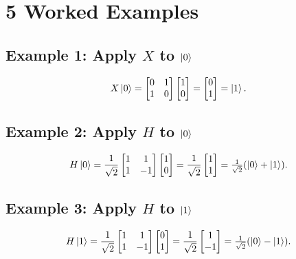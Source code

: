 \documentclass[12pt]{article}
\begin{document}
\section*{5 \quad Worked Examples}

\subsection*{Example 1: Apply \(X\) to \(\ket{0}\)}
\[
   X\ket{0} =
   \begin{bmatrix}0&1\\1&0\end{bmatrix}
   \begin{bmatrix}1\\0\end{bmatrix}
   =
   \begin{bmatrix}0\\1\end{bmatrix}
   =\ket{1}.
\]

\subsection*{Example 2: Apply \(H\) to \(\ket{0}\)}
\[
   H\ket{0}
   =
   \frac1{\sqrt2}
   \begin{bmatrix}1&1\\1&-1\end{bmatrix}
   \begin{bmatrix}1\\0\end{bmatrix}
   =
   \frac1{\sqrt2}
   \begin{bmatrix}1\\1\end{bmatrix}
   =
   \tfrac1{\sqrt2}(\ket{0}+\ket{1}).
\]

\subsection*{Example 3: Apply \(H\) to \(\ket{1}\)}
\[
   H\ket{1}
   =
   \frac1{\sqrt2}
   \begin{bmatrix}1&1\\1&-1\end{bmatrix}
   \begin{bmatrix}0\\1\end{bmatrix}
   =
   \frac1{\sqrt2}
   \begin{bmatrix}1\\-1\end{bmatrix}
   =
   \tfrac1{\sqrt2}(\ket{0}-\ket{1}).
\]
\end{document}
